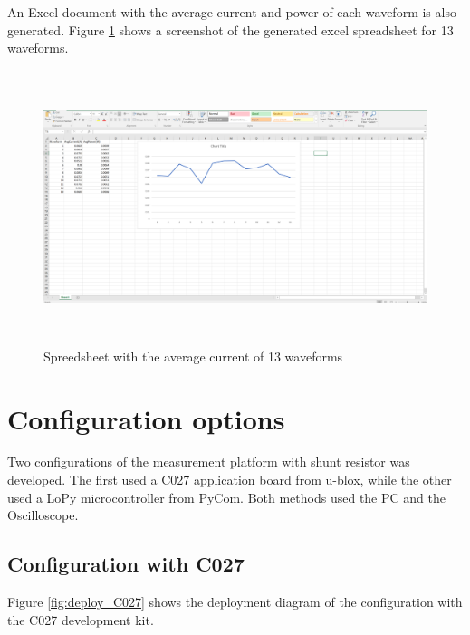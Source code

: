 An Excel document with the average current and power of each waveform is also generated. Figure \ref{fig:waveexcel} shows a screenshot of the generated excel spreadsheet for 13 waveforms.

\begin{figure}[H]
\centering
\includegraphics[height=8.0cm]{Project_Report/Images/waveformexcel.PNG}
\caption{Spreedsheet with the average current of 13 waveforms}
\label{fig:waveexcel}
\end{figure}
 



\section{Configuration options}
 Two configurations of the measurement platform with shunt resistor was developed. The first used a C027 application board from u-blox, while the other used a LoPy microcontroller from PyCom. Both methods used the PC and the Oscilloscope. 
 


\subsection{Configuration with C027}
Figure \ref{fig:deploy_C027} shows the deployment diagram of the configuration with the C027 development kit.  

